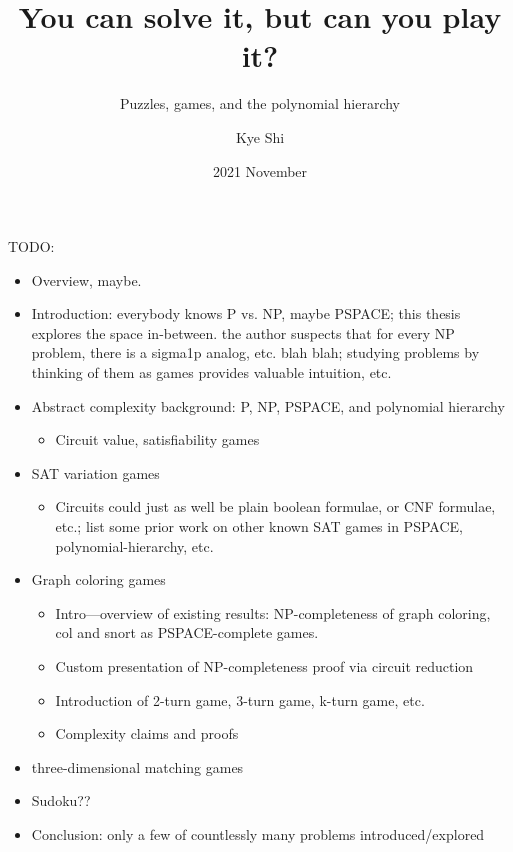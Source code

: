 \documentclass{final-report}
\title{You can solve it, but can you play it?}
\subtitle{Puzzles, games, and the polynomial hierarchy}
\author{Kye Shi}
\date{2021 November}
\begin{document}
\frontmatter
\maketitle
\tableofcontents

TODO:

\begin{itemize}
  \item Overview, maybe.
  \item Introduction: everybody knows P vs. NP, maybe PSPACE; this thesis
    explores the space in-between.  the author suspects that for every NP
    problem, there is a sigma1p analog, etc. blah blah; studying problems by
    thinking of them as games provides valuable intuition, etc.
  \item Abstract complexity background: P, NP, PSPACE, and polynomial hierarchy
    \begin{itemize}
      \item Circuit value, satisfiability games
    \end{itemize}
  \item SAT variation games
    \begin{itemize}
      \item Circuits could just as well be plain boolean formulae, or CNF
        formulae, etc.; list some prior work on other known SAT games in
        PSPACE, polynomial-hierarchy, etc.
    \end{itemize}
  \item Graph coloring games
    \begin{itemize}
      \item Intro---overview of existing results: NP-completeness of graph
        coloring, col and snort as PSPACE-complete games.
      \item Custom presentation of NP-completeness proof via circuit reduction
      \item Introduction of 2-turn game, 3-turn game, k-turn game, etc.
      \item Complexity claims and proofs
    \end{itemize}
  \item three-dimensional matching games
  \item Sudoku??
  \item Conclusion: only a few of countlessly many problems introduced/explored
\end{itemize}


\mainmatter




%
%
%
%

\printbibliography[heading=bibnumbered]
\end{document}
